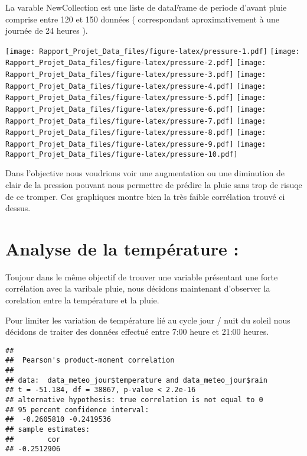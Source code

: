 \documentclass[
]{article}
\newenvironment{Shaded}{\begin{snugshade}}{\end{snugshade}}
\newcommand{\FunctionTok}[1]{\textcolor[rgb]{0.00,0.00,0.00}{#1}}
\newcommand{\NormalTok}[1]{#1}
\newcommand{\SpecialCharTok}[1]{\textcolor[rgb]{0.00,0.00,0.00}{#1}}
\begin{document}
La varable NewCollection est une liste de dataFrame de periode d'avant
pluie comprise entre 120 et 150 données ( correspondant aproximativement
à une journée de 24 heures ).

\texttt{[image: Rapport\_Projet\_Data\_files/figure-latex/pressure-1.pdf]}
\texttt{[image: Rapport\_Projet\_Data\_files/figure-latex/pressure-2.pdf]}
\texttt{[image: Rapport\_Projet\_Data\_files/figure-latex/pressure-3.pdf]}
\texttt{[image: Rapport\_Projet\_Data\_files/figure-latex/pressure-4.pdf]}
\texttt{[image: Rapport\_Projet\_Data\_files/figure-latex/pressure-5.pdf]}
\texttt{[image: Rapport\_Projet\_Data\_files/figure-latex/pressure-6.pdf]}
\texttt{[image: Rapport\_Projet\_Data\_files/figure-latex/pressure-7.pdf]}
\texttt{[image: Rapport\_Projet\_Data\_files/figure-latex/pressure-8.pdf]}
\texttt{[image: Rapport\_Projet\_Data\_files/figure-latex/pressure-9.pdf]}
\texttt{[image: Rapport\_Projet\_Data\_files/figure-latex/pressure-10.pdf]}

Dans l'objective nous voudrions voir une augmentation ou une diminution
de clair de la pression pouvant nous permettre de prédire la pluie sans
trop de risuqe de ce tromper. Ces graphiques montre bien la très faible
corrélation trouvé ci dessus.

\hypertarget{analyse-de-la-tempuxe9rature}{%
\section{Analyse de la température
:}\label{analyse-de-la-tempuxe9rature}}

Toujour dans le même objectif de trouver une variable présentant une
forte corrélation avec la varibale pluie, nous décidons maintenant
d'observer la corelation entre la température et la pluie.

Pour limiter les variation de température lié au cycle jour / nuit du
soleil nous décidons de traiter des données effectué entre 7:00 heure et
21:00 heures.

\begin{Shaded}
\end{Shaded}

\begin{verbatim}
## 
##  Pearson's product-moment correlation
## 
## data:  data_meteo_jour$temperature and data_meteo_jour$rain
## t = -51.184, df = 38867, p-value < 2.2e-16
## alternative hypothesis: true correlation is not equal to 0
## 95 percent confidence interval:
##  -0.2605810 -0.2419536
## sample estimates:
##        cor 
## -0.2512906
\end{verbatim}
\end{document}
